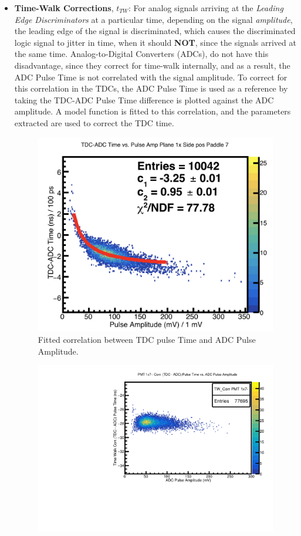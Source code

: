 \documentclass[14pt]{article}
\begin{document}
\begin{itemize}
\item \textbf{Time-Walk Corrections}, $t_{TW}$: For analog signals arriving at the \textit{Leading Edge Discriminators}
  at a particular time, depending on the signal \textit{amplitude}, the leading edge of the signal is discriminated,
  which causes the discriminated logic signal to jitter in time, when it should \textbf{NOT}, since the signals arrived at the
  same time. Analog-to-Digital Converters (ADCs), do not have this disadvantage, since they correct for time-walk internally,
  and as a result, the ADC Pulse Time is not correlated with the signal amplitude. To correct for this correlation in the TDCs,
  the ADC Pulse Time is used as a reference by taking the TDC-ADC Pulse Time difference is plotted against the ADC amplitude. A model
  function is fitted to this correlation, and the parameters extracted are used to correct the TDC time.
\begin{figure}[H]
  \captionsetup{justification=raggedright,singlelinecheck=false}
    \includegraphics[scale=0.35]{1x7-_TWFit.png}
    \caption{Fitted correlation between TDC pulse Time and ADC Pulse Amplitude.}
    \label{fig:TWFit}
  \end{figure}
\begin{figure}[H]
    \captionsetup{justification=raggedright,singlelinecheck=false}
    \includegraphics[scale=0.75]{1x7-_TWCorr.pdf}

\end{figure}
\end{itemize}
\end{document}
